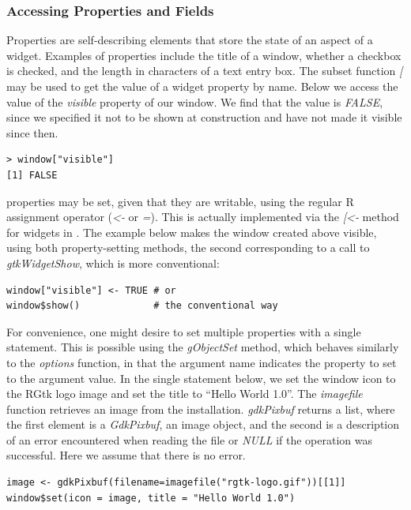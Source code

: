 \documentclass[article]{jss}
\begin{document}
\subsubsection{Accessing Properties and Fields}

Properties are self-describing 
elements that store the state of an aspect of a widget.  Examples of
properties include the title of a window, whether a checkbox is
checked, and the length in characters of a text entry box. The
 subset function \emph{[} may be used to get the value of
a widget property by name.  Below we access the value of the
\emph{visible} property of our window. We find that the value is
\emph{FALSE}, since we specified it not to be shown at construction
and have not made it visible since then.
\begin{verbatim}
> window["visible"]
[1] FALSE
\end{verbatim}

 properties may be set, given that they are writable, using
the regular R assignment operator (\emph{<-} or \emph{=}). This is
actually implemented via the \emph{[<-} method for  widgets
in . The example below makes the window created above
visible, using both property-setting methods,
the second corresponding to a call to \emph{gtkWidgetShow}, which is
more conventional:
\begin{verbatim}
window["visible"] <- TRUE # or
window$show()             # the conventional way
\end{verbatim}

For convenience, one might desire to set multiple properties with a
single statement.
This is possible using the \emph{gObjectSet} method, which behaves
similarly
to the  \emph{options} function, in that the argument name
indicates
the property to set to the argument value. 
In the single statement below, we 
set the window icon to the RGtk logo image and set the title to
``Hello World 1.0''. 
The \emph{imagefile} function retrieves an image from the 
installation.
\emph{gdkPixbuf} returns a list, where the first element is a
\emph{GdkPixbuf}, an image object,
and the second is a description of an error encountered when reading
the file
or \emph{NULL} if the operation was successful. Here we assume that
there is no error.
\begin{verbatim}
image <- gdkPixbuf(filename=imagefile("rgtk-logo.gif"))[[1]]
window$set(icon = image, title = "Hello World 1.0")
\end{verbatim}
\end{document}
